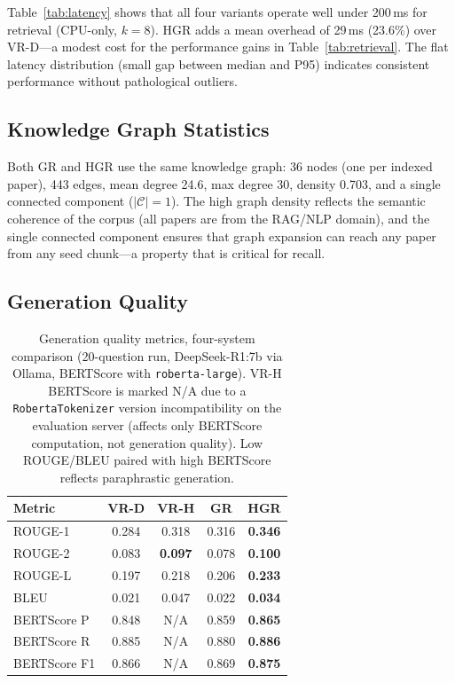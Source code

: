\documentclass[journal]{IEEEtran}
\begin{document}
Table~\ref{tab:latency} shows that all four variants operate well
under 200\,ms for retrieval (CPU-only, $k=8$). HGR adds a
mean overhead of 29\,ms (23.6\%) over VR-D—a modest cost for
the performance gains in Table~\ref{tab:retrieval}. The flat
latency distribution (small gap between median and P95) indicates
consistent performance without pathological outliers.

\subsection{Knowledge Graph Statistics}

Both GR and HGR use the same knowledge graph:
36 nodes (one per indexed paper), 443 edges,
mean degree 24.6, max degree 30, density 0.703, and a single
connected component ($|\mathcal{C}|=1$). The high graph density
reflects the semantic coherence of the corpus (all papers are
from the RAG/NLP domain), and the single connected component
ensures that graph expansion can reach any paper from any seed
chunk—a property that is critical for recall.

\subsection{Generation Quality}

\begin{table}[!t]
\caption{Generation quality metrics, four-system comparison (20-question run,
  DeepSeek-R1:7b via Ollama, BERTScore with \texttt{roberta-large}).
  VR-H BERTScore is marked N/A due to a \texttt{RobertaTokenizer}
  version incompatibility on the evaluation server (affects only
  BERTScore computation, not generation quality).
  Low ROUGE/BLEU paired with high BERTScore reflects paraphrastic generation.}
\label{tab:generation}
\centering
\setlength{\tabcolsep}{4pt}
\begin{tabular}{lcccc}
\toprule
\textbf{Metric} & \textbf{VR-D} & \textbf{VR-H} & \textbf{GR} & \textbf{HGR} \\
\midrule
ROUGE-1         & 0.284 & 0.318            & 0.316 & \textbf{0.346} \\
ROUGE-2         & 0.083 & \textbf{0.097}   & 0.078 & \textbf{0.100} \\
ROUGE-L         & 0.197 & 0.218            & 0.206 & \textbf{0.233} \\
BLEU            & 0.021 & 0.047            & 0.022 & \textbf{0.034} \\
BERTScore P     & 0.848 & N/A              & 0.859 & \textbf{0.865} \\
BERTScore R     & 0.885 & N/A              & 0.880 & \textbf{0.886} \\
BERTScore F1    & 0.866 & N/A              & 0.869 & \textbf{0.875} \\
\bottomrule
\end{tabular}
\end{table}
\end{document}
